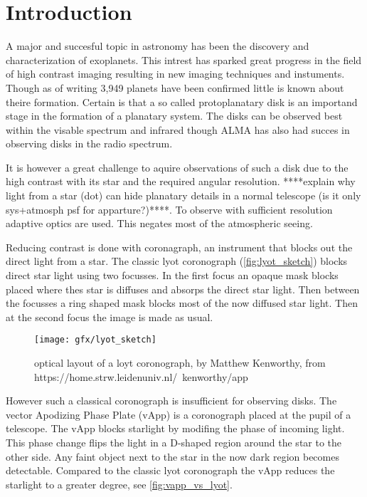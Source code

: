
\chapter{Introduction} %

\label{ch:intro} %


A major and succesful topic in astronomy has been the discovery and characterization of exoplanets. This intrest has sparked great progress in the field of high contrast imaging resulting in new imaging techniques and instuments. Though as of writing 3,949 planets \cite{nasa} have been confirmed little is known about theire formation. Certain is that a so called protoplanatary disk is an importand stage in the formation of a planatary system. The disks can be observed best within the visable spectrum and infrared though ALMA has also had succes in observing disks in the radio spectrum. 

It is however a great challenge to aquire observations of such a disk due to the high contrast with its star and the required angular resolution. ****explain why light from a star (dot) can hide planatary details in a normal telescope (is it only sys+atmosph psf for apparture?)****. To observe with sufficient resolution adaptive optics are used. This negates most of the atmospheric seeing.

Reducing contrast is done with coronagraph, an instrument that blocks out the direct light from a star. The classic lyot coronograph (\autoref{fig:lyot_sketch}) blocks direct star light using two focusses. In the first focus an opaque mask blocks placed where thes star is diffuses and absorps the direct star light. Then between the focusses a ring shaped mask blocks most of the now diffused star light. Then at the second focus the image is made as usual.

\begin{figure}
    \texttt{[image: gfx/lyot\_sketch]}
    \caption{optical layout of a loyt coronograph, by Matthew Kenworthy, from https://home.strw.leidenuniv.nl/~kenworthy/app}
    \label{fig:lyot_sketch}
\end {figure}

However such a classical coronograph is insufficient for observing disks. The vector Apodizing Phase Plate (vApp) \cite{papervApp} is a coronograph placed at the pupil of a telescope. The vApp blocks starlight by modifing the phase of incoming light. This phase change flips the light in a D-shaped region around the star to the other side. Any faint object next to the star in the now dark region becomes detectable. Compared to the classic lyot coronograph the vApp reduces the starlight to a greater degree, see \autoref{fig:vapp_vs_lyot}.  

